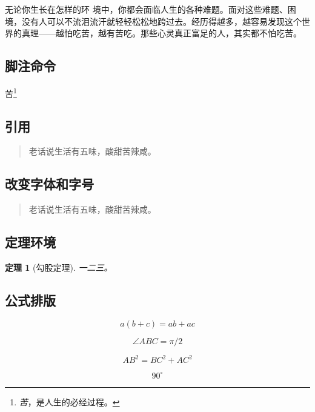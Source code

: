 \documentclass{hitec}
\newtheorem{thm}{定理}
\begin{document}
无论你生长在怎样的环
境中，你都会面临人生的各种难题。面对这些难题、困境，没有人可以不流泪流汗就轻轻松松地跨过去。经历得越多，越容易发现这个世界的真理——越怕吃苦，越有苦吃。那些心灵真正富足的人，其实都不怕吃苦。

\subsection{脚注命令}
苦\footnote{\emph 苦，是人生的必经过程。}

\subsection{引用}
\begin{quote}
老话说生活有五味，酸甜苦辣咸。
\end{quote}

\subsection{改变字体和字号}
\begin{quote}
 \kaishu 老话说生活有五味，酸甜苦辣咸。
\end{quote}

\subsection{定理环境}
\begin{thm}[勾股定理]
一二三。
\end{thm}

\subsection{公式排版}
\begin{equation}
a(b+c) = ab + ac
\end{equation}

\begin{equation}
\angle ABC = \pi / 2
\end{equation}

\begin{equation}\label{eq:gougu}
AB^2 = BC^2 + AC^2
\end{equation}

\begin{equation}
90^\circ
\end{equation}
\end{document}
